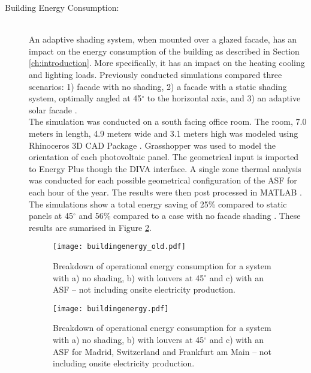 \begin{description}


\item[Building Energy Consumption: ] \hfill\\
An adaptive shading system, when mounted over a glazed facade, has an impact on the energy consumption of the building as described in Section \ref{ch:introduction}. More specifically, it has an impact on the heating cooling and lighting loads. Previously conducted simulations compared three scenarios: 1) facade with no shading, 2) a facade with a static shading system, optimally angled at 45$^{\circ}$ to the horizontal axis, and 3) an adaptive solar facade \cite{jayathissa2015abs}.\\

The simulation was conducted on a south facing office room. The room, 7.0 meters in length, 4.9 meters wide and 3.1 meters high was modeled using Rhinoceros 3D CAD Package \cite{Rhino}. Grasshopper \cite{grasshopper} was used to model the orientation of each photovoltaic panel. The geometrical input is imported to Energy Plus \cite{energyplus} though the DIVA \cite{DIVA} interface. A single zone thermal analysis was conducted for each possible geometrical configuration of the ASF for each hour of the year. The results were then post processed in MATLAB \cite{MATLAB}.\\

The simulations show a total energy saving of 25\% compared to static panels at 45$^\circ$ and 56\% compared to a case with no facade shading \cite{jayathissa2015abs}. These results are sumarised in Figure \ref{fig:operational}. \\


\begin{figure}[H]
\begin{center}
\begin{mdframed}[linecolor=magenta, linewidth=2pt]
\texttt{[image: buildingenergy\_old.pdf]}
\caption{Breakdown of operational energy consumption for a system with a) no shading, b) with louvers at 45$^\circ$ and c) with an ASF -- not including onsite electricity production.}
\label{fig:operationalold}
\end{mdframed}
\end{center}
\end{figure}

\begin{figure}[H]
\begin{center}
\begin{mdframed}[linecolor=cyan, linewidth=2pt]
\texttt{[image: buildingenergy.pdf]}
\caption{Breakdown of operational energy consumption for a system with a) no shading, b) with louvers at 45$^\circ$ and c) with an ASF for Madrid, Switzerland and Frankfurt am Main -- not including onsite electricity production.}
\label{fig:operational}
\end{mdframed}
\end{center}
\end{figure}


\end{description}
